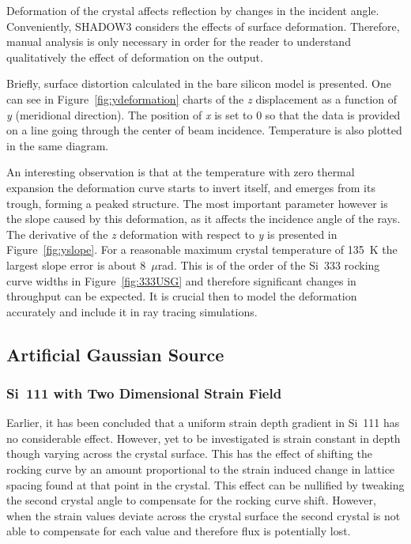 \documentclass[preprint]{iucr}              %
\begin{document}
Deformation of the crystal affects reflection by changes in the incident angle. Conveniently, SHADOW3 considers the effects of surface deformation. Therefore, manual analysis is only necessary in order for the reader to understand qualitatively the effect of deformation on the output.

Briefly, surface distortion calculated in the bare silicon model is presented. One can see in Figure~\ref{fig:ydeformation} charts of the \textit{z} displacement as a function of \textit{y} (meridional direction). The position of \textit{x} is set to 0 so that the data is provided on a line going through the center of beam incidence. Temperature is also plotted in the same diagram.

An interesting observation is that at the temperature with zero thermal expansion the deformation curve starts to invert itself, and emerges from its trough, forming a peaked structure. The most important parameter however is the slope caused by this deformation, as it affects the incidence angle of the rays. The derivative of the \textit{z} deformation with respect to \textit{y} is presented in Figure~\ref{fig:yslope}. For a reasonable maximum crystal temperature of 135~K the largest slope error is about 8~$\mu$rad. This is of the order of the Si~333 rocking curve widths in Figure~\ref{fig:333USG} and therefore significant changes in throughput can be expected. It is crucial then to model the deformation accurately and include it in ray tracing simulations.

\subsection{Artificial Gaussian Source}\label{gaussian}

\subsubsection{Si~111 with Two Dimensional Strain Field}\label{111simulation}
Earlier, it has been concluded that a uniform strain depth gradient in Si~111 has no considerable effect. However, yet to be investigated is strain constant in depth though varying across the crystal surface. This has the effect of shifting the rocking curve by an amount proportional to the strain induced change in lattice spacing found at that point in the crystal. This effect can be nullified by tweaking the second crystal angle to compensate for the rocking curve shift. However, when the strain values deviate across the crystal surface the second crystal is not able to compensate for each value and therefore flux is potentially lost.
\end{document}
